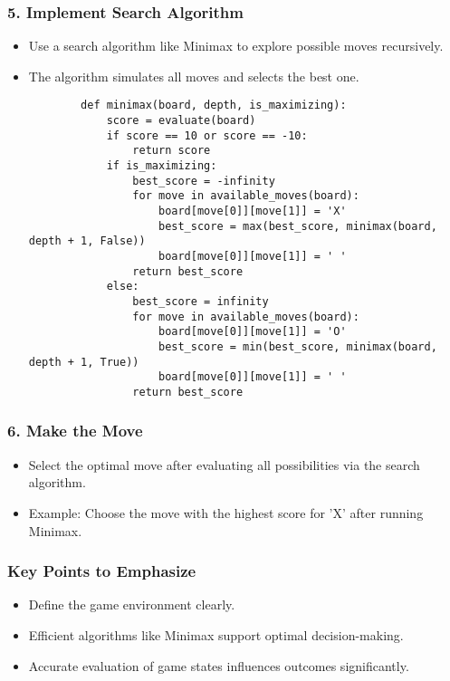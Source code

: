\documentclass[aspectratio=169]{beamer}
\begin{document}
\begin{frame}[fragile]
    \frametitle{5. Implement Search Algorithm}
    \begin{itemize}
        \item Use a search algorithm like Minimax to explore possible moves recursively.
        \item The algorithm simulates all moves and selects the best one.
        
        \begin{lstlisting}
        def minimax(board, depth, is_maximizing):
            score = evaluate(board)
            if score == 10 or score == -10:
                return score
            if is_maximizing:
                best_score = -infinity
                for move in available_moves(board):
                    board[move[0]][move[1]] = 'X'
                    best_score = max(best_score, minimax(board, depth + 1, False))
                    board[move[0]][move[1]] = ' '
                return best_score
            else:
                best_score = infinity
                for move in available_moves(board):
                    board[move[0]][move[1]] = 'O'
                    best_score = min(best_score, minimax(board, depth + 1, True))
                    board[move[0]][move[1]] = ' '
                return best_score
        \end{lstlisting}
    \end{itemize}
\end{frame}

\begin{frame}[fragile]
    \frametitle{6. Make the Move}
    \begin{itemize}
        \item Select the optimal move after evaluating all possibilities via the search algorithm.
        \item Example: Choose the move with the highest score for 'X' after running Minimax.
    \end{itemize}
\end{frame}

\begin{frame}[fragile]
    \frametitle{Key Points to Emphasize}
    \begin{itemize}
        \item Define the game environment clearly.
        \item Efficient algorithms like Minimax support optimal decision-making.
        \item Accurate evaluation of game states influences outcomes significantly.
    \end{itemize}
\end{frame}
\end{document}
